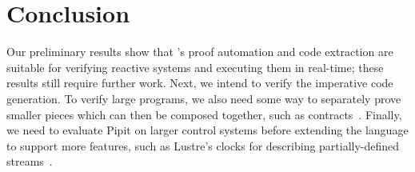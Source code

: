 \documentclass[sigplan,screen, review]{acmart}
\begin{document}
\section{Conclusion}

Our preliminary results show that \fstar{}'s proof automation and code extraction are suitable for verifying reactive systems and executing them in real-time; these results still require further work.
Next, we intend to verify the imperative code generation.
To verify large programs, we also need some way to separately prove smaller pieces which can then be composed together, such as contracts~\cite{champion2016kind2}.
Finally, we need to evaluate Pipit on larger control systems before extending the language to support more features, such as Lustre's clocks for describing partially-defined streams~\cite{caspi1995functional}.







\end{document}

